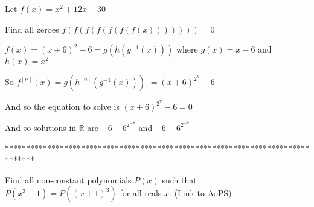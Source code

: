 \begin{solution}
	\begin{tcolorbox}Let $ f(x) = x^2 + 12x + 30$

Find all zeroes $ f(f(f(f(f(f(f(x))))))) = 0$

 \end{tcolorbox}

$ f(x)=(x+6)^2-6=g(h(g^{-1}(x)))$ where $ g(x)=x-6$ and $ h(x)=x^2$

So $ f^{[n]}(x)=g(h^{[n]}(g^{-1}(x)))$ $ =(x+6)^{2^n}-6$

And so the equation to solve is $ (x+6)^{2^7}-6=0$

And so solutions in $ \mathbb R$ are $ -6-6^{2^{-7}}$ and $ -6+6^{2^{-7}}$
\end{solution}



*******************************************************************************
-------------------------------------------------------------------------------

\begin{problem}
	Find all non-constant polynomials $P(x)$ such that $P(x^3 +1) = P((x + 1)^3)$ for all reals $x$.
	\flushright \href{https://artofproblemsolving.com/community/c6h344295}{(Link to AoPS)}
\end{problem}



